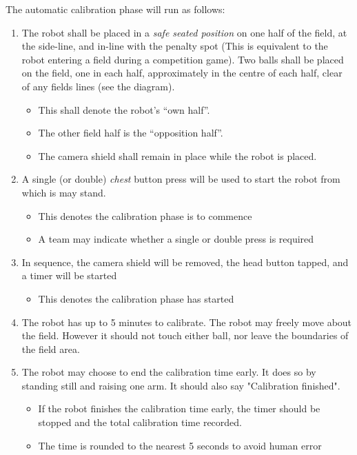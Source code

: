 The automatic calibration phase will run as follows:
\begin{enumerate}
    \item The robot shall be placed in a \textit{safe seated position} on one half of the field, at the side-line, and in-line with the penalty spot (This is equivalent to the robot entering a field during a competition game). Two balls shall be placed on the field, one in each half, approximately in the centre of each half, clear of any fields lines (see the diagram).
    \begin{itemize}
        \item This shall denote the robot's  ``own half''.
        \item The other field half is the ``opposition half''.
        \item The camera shield shall remain in place while the robot is placed.
    \end{itemize} 
    \item A single (or double) \textit{chest} button press will be used to start the robot from which is may stand. 
    \begin{itemize}
        \item This denotes the calibration phase is to commence
        \item A team may indicate whether a single or double press is required
    \end{itemize} 
    \item In sequence, the camera shield will be removed, the head button tapped, and a timer will be started
    \begin{itemize}
        \item This denotes the calibration phase has started
    \end{itemize} 
    \item The robot has up to 5 minutes to calibrate. The robot may freely move about the field. However it should not touch either ball, nor leave the boundaries of the field area.
    \item The robot may choose to end the calibration time early. It does so by standing still and raising one arm. It should also say "Calibration finished".
    \begin{itemize}
        \item If the robot finishes the calibration time early, the timer should be stopped and the total calibration time recorded.
        \item The time is rounded to the nearest 5 seconds to avoid human error

\end{itemize}
\end{enumerate}
